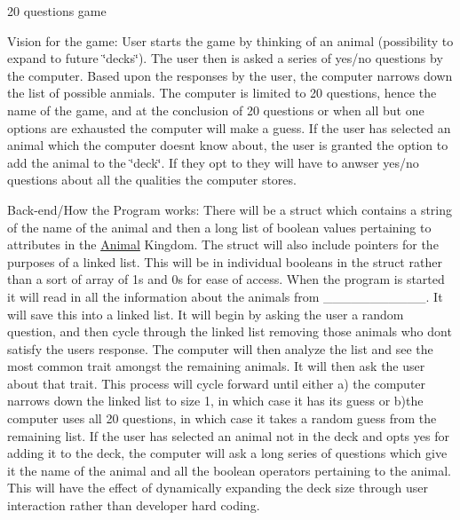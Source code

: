 20 questions game

Vision for the game\+: User starts the game by thinking of an animal (possibility to expand to future \char`\"{}decks\char`\"{}). The user then is asked a series of yes/no questions by the computer. Based upon the responses by the user, the computer narrows down the list of possible anmials. The computer is limited to 20 questions, hence the name of the game, and at the conclusion of 20 questions or when all but one options are exhausted the computer will make a guess. If the user has selected an animal which the computer doesn\textquotesingle{}t know about, the user is granted the option to add the animal to the \char`\"{}deck\char`\"{}. If they opt to they will have to anwser yes/no questions about all the qualities the computer stores.

Back-\/end/\+How the Program works\+: There will be a struct which contains a string of the name of the animal and then a long list of boolean values pertaining to attributes in the \hyperlink{class_animal}{Animal} Kingdom. The struct will also include pointers for the purposes of a linked list. This will be in individual boolean\textquotesingle{}s in the struct rather than a sort of array of 1\textquotesingle{}s and 0\textquotesingle{}s for ease of access. When the program is started it will read in all the information about the animals from \+\_\+\+\_\+\+\_\+\+\_\+\+\_\+\+\_\+\+\_\+\+\_\+\+\_\+\+\_\+\+\_\+. It will save this into a linked list. It will begin by asking the user a random question, and then cycle through the linked list removing those animals who dont satisfy the user\textquotesingle{}s response. The computer will then analyze the list and see the most common trait amongst the remaining animals. It will then ask the user about that trait. This process will cycle forward until either a) the computer narrows down the linked list to size 1, in which case it has its guess or b)the computer uses all 20 questions, in which case it takes a random guess from the remaining list. If the user has selected an animal not in the deck and opts yes for adding it to the deck, the computer will ask a long series of questions which give it the name of the animal and all the boolean operators pertaining to the animal. This will have the effect of dynamically expanding the deck size through user interaction rather than developer hard coding. 